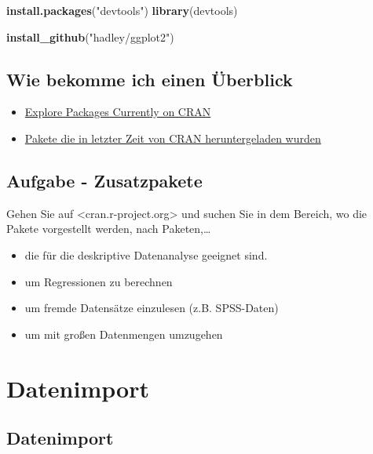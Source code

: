 \documentclass[]{article}
\newenvironment{Shaded}{\begin{snugshade}}{\end{snugshade}}
\newcommand{\KeywordTok}[1]{\textcolor[rgb]{0.13,0.29,0.53}{\textbf{{#1}}}}
\newcommand{\StringTok}[1]{\textcolor[rgb]{0.31,0.60,0.02}{{#1}}}
\newcommand{\NormalTok}[1]{{#1}}
\providecommand{\tightlist}{%
  \setlength{\itemsep}{0pt}\setlength{\parskip}{0pt}}
\begin{document}
\begin{Shaded}
\begin{Highlighting}[]
\KeywordTok{install.packages}\NormalTok{(}\StringTok{"devtools"}\NormalTok{)}
\KeywordTok{library}\NormalTok{(devtools)}

\KeywordTok{install_github}\NormalTok{(}\StringTok{"hadley/ggplot2"}\NormalTok{)}
\end{Highlighting}
\end{Shaded}

\subsection{Wie bekomme ich einen
Überblick}\label{wie-bekomme-ich-einen-uberblick}

\begin{itemize}
\item
  \href{https://mran.microsoft.com/packages/}{Explore Packages Currently
  on CRAN}
\item
  \href{https://gallery.shinyapps.io/cran-gauge/}{Pakete die in letzter
  Zeit von CRAN heruntergeladen wurden}
\end{itemize}

\subsection{Aufgabe - Zusatzpakete}\label{aufgabe---zusatzpakete}

Gehen Sie auf \textless{}cran.r-project.org\textgreater{} und suchen Sie
in dem Bereich, wo die Pakete vorgestellt werden, nach Paketen,\ldots{}

\begin{itemize}
\tightlist
\item
  die für die deskriptive Datenanalyse geeignet sind.
\item
  um Regressionen zu berechnen
\item
  um fremde Datensätze einzulesen (z.B. SPSS-Daten)
\item
  um mit großen Datenmengen umzugehen
\end{itemize}

\section{Datenimport}\label{datenimport}

\subsection{Datenimport}\label{datenimport-1}
\end{document}
